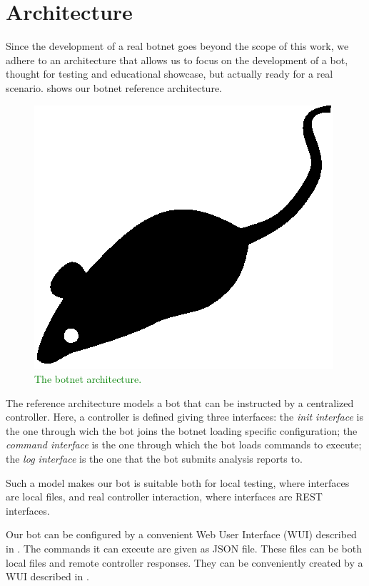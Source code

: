 \section{Architecture}
\label{sec:architecture}

Since the development of a real botnet goes beyond the scope of this work, we adhere to an architecture that allows us to focus on the development of a bot, thought for testing and educational showcase, but actually ready for a real scenario.  shows our botnet reference architecture.

\begin{figure}[tp]
  \centering
  \includegraphics{./fig/acmlarge-mouse}
  \caption{\textcolor{green}{The botnet architecture.}}
    \label{fig:botnet-architecture}
\end{figure}

The reference architecture models a bot that can be instructed by a centralized controller.
Here, a controller is defined giving three interfaces: the \textit{init interface} is the one through wich the bot joins the botnet loading specific configuration; the \textit{command interface} is the one through which the bot loads commands to execute; the \textit{log interface} is the one that the bot submits analysis reports to.

Such a model makes our bot is suitable both for local testing, where interfaces are local files, and real controller interaction, where interfaces are REST interfaces.

Our bot can be configured by a convenient Web User Interface (WUI) described in . The commands it can execute are given as JSON file. These files can be both local files and remote controller responses. They can be conveniently created by a WUI described in .
